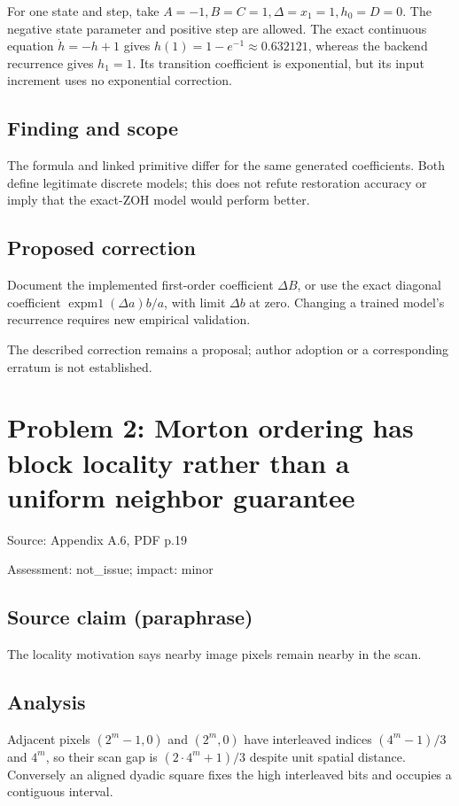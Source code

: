 \documentclass[11pt]{article}
\begin{document}
For one state and step, take \(A=-1,B=C=1,\Delta=x_1=1,h_0=D=0\). The negative state parameter and positive step are allowed. The exact continuous equation \(\dot h=-h+1\) gives \(h(1)=1-e^{-1}\approx0.632121\), whereas the backend recurrence gives \(h_1=1\). Its transition coefficient is exponential, but its input increment uses no exponential correction.

\subsection*{Finding and scope}

The formula and linked primitive differ for the same generated coefficients. Both define legitimate discrete models; this does not refute restoration accuracy or imply that the exact-ZOH model would perform better.

\subsection*{Proposed correction}

Document the implemented first-order coefficient \(\Delta B\), or use the exact diagonal coefficient \(\operatorname{expm1}(\Delta a)b/a\), with limit \(\Delta b\) at zero. Changing a trained model’s recurrence requires new empirical validation.

The described correction remains a proposal; author adoption or a corresponding erratum is not established.

\section*{Problem 2: Morton ordering has block locality rather than a uniform neighbor guarantee}

Source: Appendix A.6, PDF p.19

Assessment: not\_issue; impact: minor

\subsection*{Source claim (paraphrase)}

The locality motivation says nearby image pixels remain nearby in the scan.

\subsection*{Analysis}

Adjacent pixels \((2^m-1,0)\) and \((2^m,0)\) have interleaved indices \((4^m-1)/3\) and \(4^m\), so their scan gap is \((2\cdot4^m+1)/3\) despite unit spatial distance. Conversely an aligned dyadic square fixes the high interleaved bits and occupies a contiguous interval.
\end{document}
